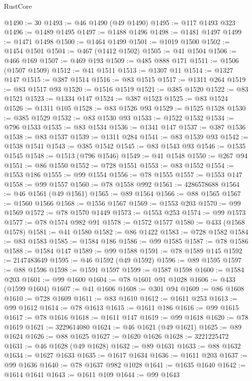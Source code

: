 \begin{lexlean}{RustCore}
\begin{coremodule}
@1490 := 30
@1493 := @46 @1490 (@49 @1490)
@1495 := @117 @1493 @323
@1496 := @1489 @1495
@1497 := @1488 @1496
@1498 := @1481 @1497
@1499 := @1471 @1498
@1500 := @1464 @1499
@1501 := @1019 @1500
@1502 := @1454 @1501
@1504 := @467 (@1412 @1502)
@1505 := @41 @1504
@1506 := @466 @169
@1507 := @469 @193
@1509 := @485 @888 @171
@1511 := @1506 (@1507 @1509)
@1512 := @41 @1511
@1513 := @1307 @11
@1514 := @1327 @147
@1515 := @387 @1514
@1516 := @83 @1515
@1517 := @1311 @264
@1519 := @83 @1517 @93
@1520 := @1516 @1519
@1521 := @385 @1520
@1522 := @83 @1521
@1523 := @1334 @147
@1524 := @387 @1523
@1525 := @83 @1524
@1526 := @1311 @105
@1528 := @83 @1526 @93
@1529 := @1525 @1528
@1530 := @385 @1529
@1532 := @83 @1530 @93
@1533 := @1522 @1532
@1534 := @796 @1533
@1535 := @83 @1534
@1536 := @1341 @147
@1537 := @387 @1536
@1538 := @83 @1537
@1539 := @1311 @284
@1541 := @83 @1539 @93
@1542 := @1538 @1541
@1543 := @385 @1542
@1545 := @83 @1543 @93
@1546 := @1535 @1545
@1548 := @1513 (@796 @1546)
@1549 := @41 @1548
@1550 := @267 @94
@1551 := @86 @1550
@1552 := @728 @1551
@1553 := @83 @1552
@1554 := @1553 @186
@1555 := @99 @1554
@1556 := @78 @1555
@1557 := @1553 @147
@1558 := @99 @1557
@1560 := @78 @1558 @992
@1561 := 4286578688
@1564 := @46 @1561 (@49 @1561)
@1565 := @89 @1564
@1566 := @88 @1565
@1567 := @1560 @1566
@1568 := @1556 @1567
@1569 := @1553 @203
@1570 := @99 @1569
@1572 := @78 @1570 @1449
@1573 := @1553 @253
@1574 := @99 @1573
@1577 := @78 @1574 @982 @91
@1578 := @1572 @1577
@1580 := @433 (@1568 @1578)
@1581 := @41 @1580
@1582 := @86 @1422
@1583 := @728 @1582
@1584 := @83 @1583
@1585 := @1584 @186
@1586 := @99 @1585
@1587 := @78 @1586
@1588 := @1584 @147
@1589 := @99 @1588
@1591 := @78 @1589 @145
@1592 := 2147483649
@1595 := @46 @1592 (@49 @1592)
@1596 := @89 @1595
@1597 := @88 @1596
@1598 := @1591 @1597
@1599 := @1587 @1598
@1600 := @1584 @203
@1601 := @99 @1600
@1604 := @78 @1601 @91 @1028
@1606 := @433 (@1599 @1604)
@1607 := @41 @1606
@1608 := @301 @94
@1609 := @86 @1608
@1610 := @728 @1609
@1611 := @83 @1610
@1612 := @1611 @253
@1613 := @99 @1612
@1614 := @78 @1613
@1615 := @1611 @186
@1616 := @99 @1615
@1617 := @78 @1616
@1618 := @1611 @147
@1619 := @99 @1618
@1620 := @78 @1619
@1621 := 3229614080
@1624 := @46 @1621 (@49 @1621)
@1625 := @89 @1624
@1626 := @88 @1625
@1627 := @1620 @1626
@1628 := 3221225472
@1631 := @46 @1628 (@49 @1628)
@1632 := @89 @1631
@1633 := @88 @1632
@1634 := @1627 @1633
@1635 := @1617 @1634
@1636 := @1611 @203
@1637 := @99 @1636
@1640 := @78 @1637 @982 @1028
@1641 := @1635 @1640
@1642 := @1614 @1641
@1643 := @1611 @109
@1644 := @99 @1643

\end{coremodule}
\end{lexlean}
